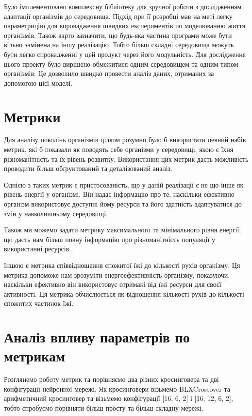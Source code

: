 Було імплементовано комплексну бібліотеку для зручної роботи з дослідженням адаптації організмів до середовища. Підхід при її розробці мав на меті легку параметрицію для впровадження швидких експериментів по моделюванню життя організмів.
Також варто зазначити, що будь-яка частина програми може бути вільно замінена на іншу реалізацію. Тобто більш складні середовища можуть бути легко спровадженні у цей продукт через його модульність. Для дослідження цього проекту було вирішено обмежитися одним середовищем та одним типом організмів. Це дозволило швидко провести аналіз даних, отриманих за допомогою цієї моделі.




\section{Метрики}

Для аналізу поколінь організмів цілком розумно було б використати певний набів метрик, які б показали як поводять себе організми у середовищі, якою є їхня різноманітність та їх рівень розвитку. Використання цих метрик дасть можливість проводити більш обґрунтований та деталізований аналіз.

Однією з таких метрик є пристосованість, що у даній реалізації є не що інше як рівень енергії у організмі. Він надає інформацію про те, наскільки ефективно організм використовує доступні йому ресурси та його здатність адаптуватися до змін у навколишньому середовищі.

Також ми можемо задати метрику максимального та мінімального рівня енергії, що дасть нам більш повну інформацію про різноманітність популяції у використанні ресурсів.

Іншою є метрика співвідношення спожитої їжі до кількості рухів організму. Ця метрика допоможе нам зрозуміти енергоефективність організму, показуючи, наскільки ефективно він використовує отримані від їжі ресурси для своєї активності. Ця метрика обчислюється як відношення кількості рухів до кількості спожитих частинок їжі.

\section{Аналіз впливу параметрів по метрикам}

Розглянемо роботу метрик та порівняємо два різних кросинговера та дві конфігурації нейронної мережі. Як кросинговери візьмемо BLXCrossover та арифметичний кросинговер та візьмемо конфігурації [16, 6, 2] і [16, 12, 6, 2], тобто спробуємо порівняти більш просту та більш складну мережі.


